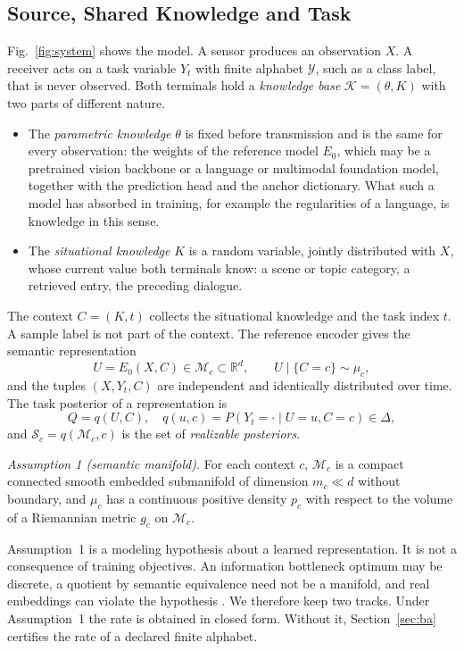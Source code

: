 \documentclass[10pt,journal]{IEEEtran}
\newcommand{\M}{\mathcal M}
\newcommand{\Sset}{\mathcal S}
\begin{document}
\subsection{Source, Shared Knowledge and Task}
Fig.~\ref{fig:system} shows the model. A sensor produces an observation $X$. A receiver acts on a task variable $Y_t$ with finite alphabet $\mathcal Y$, such as a class label, that is never observed. Both terminals hold a \emph{knowledge base} $\mathcal K=(\theta,K)$ with two parts of different nature.
\begin{itemize}
\item The \emph{parametric knowledge} $\theta$ is fixed before transmission and is the same for every observation: the weights of the reference model $E_0$, which may be a pretrained vision backbone or a language or multimodal foundation model, together with the prediction head and the anchor dictionary. What such a model has absorbed in training, for example the regularities of a language, is knowledge in this sense.
\item The \emph{situational knowledge} $K$ is a random variable, jointly distributed with $X$, whose current value both terminals know: a scene or topic category, a retrieved entry, the preceding dialogue.
\end{itemize}
The context $C=(K,t)$ collects the situational knowledge and the task index $t$. A sample label is not part of the context. The reference encoder gives the semantic representation
\begin{equation}
 U=E_0(X,C)\in\M_c\subset\mathbb R^d ,\qquad U\mid\{C=c\}\sim\mu_c ,
\end{equation}
and the tuples $(X,Y_t,C)$ are independent and identically distributed over time. The task posterior of a representation is
\begin{equation}
 Q=q(U,C),\quad q(u,c)=P(Y_t=\cdot\mid U=u,C=c)\in\Delta ,
\end{equation}
and $\Sset_c=q(\M_c,c)$ is the set of \emph{realizable posteriors}.

\emph{Assumption 1 (semantic manifold).} For each context $c$, $\M_c$ is a compact connected smooth embedded submanifold of dimension $m_c\ll d$ without boundary, and $\mu_c$ has a continuous positive density $p_c$ with respect to the volume of a Riemannian metric $g_c$ on $\M_c$.

Assumption~1 is a modeling hypothesis about a learned representation. It is not a consequence of training objectives. An information bottleneck optimum may be discrete, a quotient by semantic equivalence need not be a manifold, and real embeddings can violate the hypothesis \cite{Robinson_2025}. We therefore keep two tracks. Under Assumption~1 the rate is obtained in closed form. Without it, Section~\ref{sec:ba} certifies the rate of a declared finite alphabet.
\end{document}
